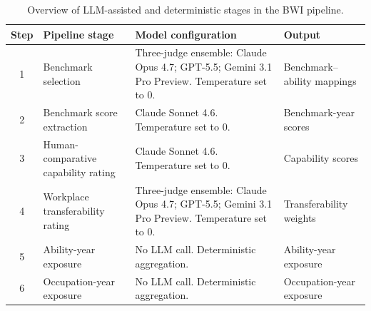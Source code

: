 \begin{table}[htbp]\centering
\caption{Overview of LLM-assisted and deterministic stages in the BWI pipeline.}\label{tab:stages}
\begin{tabular}{clp{7cm}l}\toprule
Step & Pipeline stage & Model configuration & Output \\ \midrule
1 & Benchmark selection & Three-judge ensemble: Claude Opus 4.7; GPT-5.5; Gemini 3.1 Pro Preview. Temperature set to 0. & Benchmark--ability mappings \\
2 & Benchmark score extraction & Claude Sonnet 4.6. Temperature set to 0. & Benchmark-year scores \\
3 & Human-comparative capability rating & Claude Sonnet 4.6. Temperature set to 0. & Capability scores \\
4 & Workplace transferability rating & Three-judge ensemble: Claude Opus 4.7; GPT-5.5; Gemini 3.1 Pro Preview. Temperature set to 0. & Transferability weights \\
5 & Ability-year exposure & No LLM call. Deterministic aggregation. & Ability-year exposure \\
6 & Occupation-year exposure & No LLM call. Deterministic aggregation. & Occupation-year exposure \\
\bottomrule\end{tabular}\end{table}
